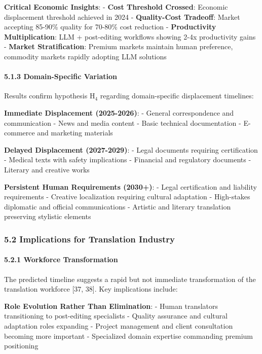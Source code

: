 \documentclass[12pt,a4paper]{article}
\begin{document}
{{{{\textbf{Critical Economic Insights}: - \textbf{Cost Threshold Crossed}:
Economic displacement threshold achieved in 2024 - \textbf{Quality-Cost
Tradeoff}: Market accepting 85-90\% quality for 70-80\% cost reduction -
\textbf{Productivity Multiplication}: LLM + post-editing workflows
showing 2-4x productivity gains - \textbf{Market Stratification}:
Premium markets maintain human preference, commodity markets rapidly
adopting LLM solutions

\hypertarget{domain-specific-variation}{%
\paragraph{5.1.3 Domain-Specific
Variation}\label{domain-specific-variation}}

Results confirm hypothesis H$_4$ regarding domain-specific displacement
timelines:

\textbf{Immediate Displacement (2025-2026)}: - General correspondence
and communication - News and media content - Basic technical
documentation - E-commerce and marketing materials

\textbf{Delayed Displacement (2027-2029)}: - Legal documents requiring
certification - Medical texts with safety implications - Financial and
regulatory documents - Literary and creative works

\textbf{Persistent Human Requirements (2030+)}: - Legal certification
and liability requirements - Creative localization requiring cultural
adaptation - High-stakes diplomatic and official communications -
Artistic and literary translation preserving stylistic elements

\hypertarget{implications-for-translation-industry}{%
\subsubsection{5.2 Implications for Translation
Industry}\label{implications-for-translation-industry}}

\hypertarget{workforce-transformation}{%
\paragraph{5.2.1 Workforce
Transformation}\label{workforce-transformation}}

The predicted timeline suggests a rapid but not immediate transformation
of the translation workforce {[}37, 38{]}. Key implications include:

\textbf{Role Evolution Rather Than Elimination}: - Human translators
transitioning to post-editing specialists - Quality assurance and
cultural adaptation roles expanding - Project management and client
consultation becoming more important - Specialized domain expertise
commanding premium positioning

}}}}
\end{document}
